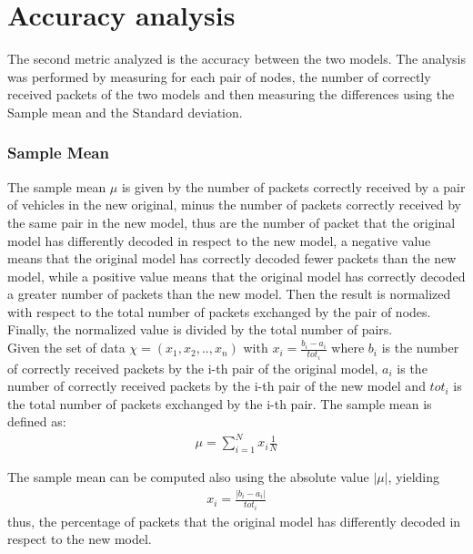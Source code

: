 \section{Accuracy analysis}
\label{sec:accuracy}
The second metric analyzed is the accuracy between the two models.
The analysis was performed by measuring for each pair of nodes, the number of correctly received packets of the two models and then measuring the differences using the Sample mean and the Standard deviation.
\subsubsection{Sample Mean}
The sample mean $\mu$ is given by the number of packets correctly received by a pair of vehicles in the new original, minus the number of packets correctly received by the same pair in the new model, thus are the number of packet that the original model has differently decoded in respect to the new model, a negative value means that the original model has correctly decoded fewer packets than the new model, while a positive value means that the original model has correctly decoded a greater number of packets than the new model. Then the result is normalized with respect to the total number of packets exchanged by the pair of nodes. Finally, the normalized value is divided by the total number of pairs.\\
Given the set of data $\chi = \left(x_1,x_2,..,x_n\right)$ with $x_i=\frac{b_i - a_i}{tot_i}$ where $b_i$ is the number of correctly received packets by the i-th pair of the original model, $a_i$ is the number of correctly received packets by the i-th pair of the new model and $tot_i$ is the total number of packets exchanged by the i-th pair. The sample mean is defined as:
\begin{gather}
\mu = \sum\limits_{i=1}^Nx_i\frac{1}{N}
    \label{eq:mean}
\end{gather}

The sample mean can be computed also using the absolute value $|\mu|$, yielding
\begin{gather}
    x_i=\frac{|b_i - a_i|}{tot_i}
    \label{eq:7}
\end{gather}
thus, the percentage of packets that the original model has differently decoded in respect to the new model.
